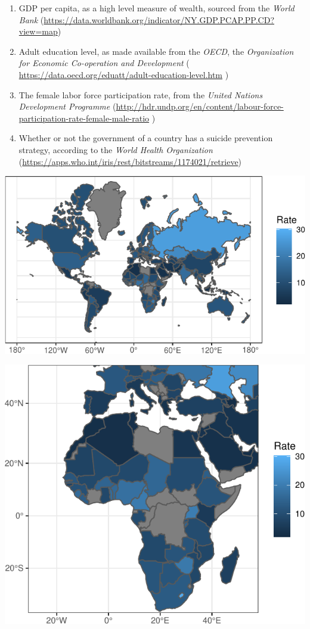 \documentclass[]{article}
\begin{document}
\begin{enumerate}
\def\labelenumi{\arabic{enumi}.}
\item
  GDP per capita, as a high level measure of wealth, sourced from the
  \emph{World Bank}
  (\url{https://data.worldbank.org/indicator/NY.GDP.PCAP.PP.CD?view=map})
\item
  Adult education level, as made available from the \emph{OECD}, the
  \emph{Organization for Economic Co-operation and Development} (
  \url{https://data.oecd.org/eduatt/adult-education-level.htm} )
\item
  The female labor force participation rate, from the \emph{United
  Nations Development Programme}
  (\url{http://hdr.undp.org/en/content/labour-force-participation-rate-female-male-ratio}
  )
\item
  Whether or not the government of a country has a suicide prevention
  strategy, according to the \emph{World Health Organization}
  (\url{https://apps.who.int/iris/rest/bitstreams/1174021/retrieve})
\end{enumerate}

\begin{center}\includegraphics{Project_Report_files/figure-latex/world_map_plot-1} \end{center}

\begin{center}\includegraphics{Project_Report_files/figure-latex/africa_map_plot-1} \end{center}
\end{document}
